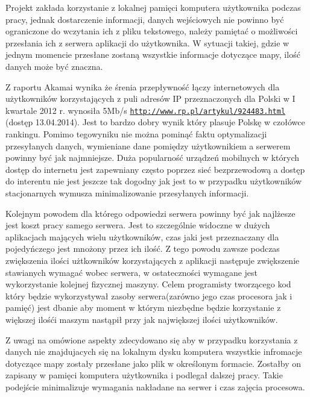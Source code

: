 Projekt zakłada korzystanie z lokalnej pamięci komputera użytkownika podczas pracy, jednak dostarczenie informacji, danych wejściowych nie powinno być ograniczone do wczytania ich z pliku tekstowego, należy pamiętać o możliwości przesłania ich z serwera aplikacji do użytkownika. W sytuacji takiej, gdzie w jednym momencie przesłane zostaną wszystkie informacje dotyczące mapy, ilość danych może być znaczna.

Z raportu Akamai wynika że śrenia przepływność łączy internetowych dla użytkowników korzystających z puli adresów IP przeznaczonych dla Polski w I kwartale 2012 r. wynosiła 5Mb/s  \underline{\texttt{http://www.rp.pl/artykul/924483.html}} (dostęp 13.04.2014). Jest to bardzo dobry wynik który plasuje Polskę w czołówce rankingu. Pomimo tegowyniku nie można pominąć faktu optymalizacji przesyłanych danych, wymieniane dane pomiędzy użytkownikiem a serwerem powinny być jak najmniejsze. Duża popularność urządzeń mobilnych w których dostęp do internetu jest zapewniany często poprzez sieć bezprzewodową a dostęp do interentu nie jest jeszcze tak dogodny jak jest to w przypadku użytkowników stacjonarnych  wymusza minimalizowanie przesyłanych informacji.

Kolejnym powodem dla którego odpowiedzi serwera powinny być jak najlżesze jest koszt pracy samego serwera. Jest to szczególnie widoczne w dużych aplikacjach mających wielu użytkowników, czas jaki jest przeznaczany dla pojedyńczego jest mnożony przez ich ilość. Z tego powodu zawsze podczas zwiększenia ilości użtkowników korzystających z aplikacji następuje zwiększenie stawianych wymagać wobec serwera, w ostateczności wymagane jest wykorzystanie kolejnej fizycznej maszyny. Celem programisty tworzącego kod który będzie wykorzystywał zasoby serwera(zarówno jego czas procesora jak i pamięć) jest dbanie aby moment w którym niezbędne będzie korzystanie z większej ilośći maszym nastąpił przy jak największej ilości użytkowników.

Z uwagi na omówione aspekty zdecydowano się aby w przypadku korzystania z danych nie znajdujacych się na lokalnym dysku komputera wszystkie infromacje dotyczące mapy zostały przesłane jako plik w określonym formacie. Zostałby on zapisany w pamięci komputera użytkownika i podlegał dalszej pracy. Takie podejście minimalizuje wymagania nakładane na serwer i czas zajęcia procesowa.

\newpage
